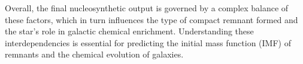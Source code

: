 Overall, the final nucleosynthetic output is governed by a complex balance of these factors, which in turn influences the type of compact remnant formed and the star's role in galactic chemical enrichment. Understanding these interdependencies is essential for predicting the initial mass function (IMF) of remnants and the chemical evolution of galaxies. 